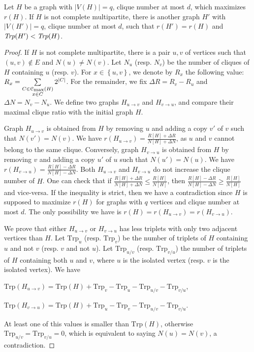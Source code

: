 \documentclass[a4paper,UKenglish,numberwithinsect,cleveref, autoref,anonymous]{lipics-v2021}
\newcommand{\set}[1]{\left\{ #1 \right\}}
\newcommand{\card}[1]{\left| #1 \right|}
\newcommand{\mcalcm}{\mathcal{C}_{\mbox{\scriptsize{max}}}}
\newcommand{\trp}{\mbox{Trp}}
\newcommand{\huv}{H_{u \rightarrow v}}
\newcommand{\hvu}{H_{v \rightarrow u}}
\begin{document}
\begin{theorem}
Let $H$ be a graph with $\card{V(H)} = q$, clique number at most $d$, which maximizes $r(H)$. If $H$ is not complete multipartite, there is another graph $H'$ with $\card{V(H')} = q$, clique number at most $d$, such that $r(H') = r(H)$ and $\emph{Trp}(H') < \emph{Trp}(H)$. 
\label{th:complete_multi}
\end{theorem}
\begin{proof}
If $H$ is not complete multipartite, there is a pair $u,v$ of vertices such that $(u,v) \notin E$ and $N(u) \neq N(v)$. Let $N_u$ (resp. $N_v$) be the number of cliques of $H$ containing $u$ (resp. $v$). For $x \in \set{u,v}$, we denote by $R_x$ the following value: $R_x = \sum\limits_{\substack{C \in \mcalcm(H) \\ x \in C}} 2^{\card{C}}$. For the remainder, we fix $\Delta R = R_v - R_u$ and $\Delta N = N_v - N_u$.
We define two graphs $\huv$ and $\hvu$, and compare their maximal clique ratio with the initial graph $H$.

Graph $\huv$ is obtained from $H$ by removing $u$ and adding a copy $v'$ of $v$ such that $N(v') = N(v)$. We have $r(\huv) = \frac{R\left[ H\right] + \Delta R}{N\left[ H\right] + \Delta N}$, as $u$ and $v$ cannot belong to the same clique. Conversely, graph $\hvu$ is obtained from $H$ by removing $v$ and adding a copy $u'$ of $u$ such that $N(u') = N(u)$. We have $r(\hvu) = \frac{R\left[ H\right] - \Delta R}{N\left[ H\right] - \Delta N}$. Both $\huv$ and $\hvu$ do not increase the clique number of $H$. One can check that if $\frac{R\left[ H\right] + \Delta R}{N\left[ H\right] + \Delta N} \le \frac{R\left[ H\right]}{N\left[ H\right]}$, then $\frac{R\left[ H\right] - \Delta R}{N\left[ H\right] - \Delta N} \ge \frac{R\left[ H\right]}{N\left[ H\right]}$ and vice-versa. If the inequality is strict, then we have a contradiction since $H$ is supposed to maximize $r(H)$ for graphs with $q$ vertices and clique number at most $d$. The only possibility we have is $r(H) = r(\huv) = r(\hvu)$.

We prove that either $\huv$ or $\hvu$ has less triplets with only two adjacent vertices than $H$. Let $\trp_u$ (resp. $\trp_v$) be the number of triplets of $H$ containing $u$ and not $v$ (resp. $v$ and not $u$). Let $\trp_{u/v}$ (resp. $\trp_{v/u}$) the number of triplets of $H$ containing both $u$ and $v$, where $u$ is the isolated vertex (resp. $v$ is the isolated vertex). We have
\begin{description}
    \item $\trp(\huv) = \trp(H) + \trp_v - \trp_u - \trp_{u/v} - \trp_{v/u}$,
    \item $\trp(\hvu) = \trp(H) + \trp_u - \trp_v - \trp_{u/v} - \trp_{v/u}$.
\end{description}
At least one of this values is smaller than $\trp(H)$, otherwise $\trp_{u/v} = \trp_{v/u} = 0$, which is equivalent to saying $N(u) = N(v)$, a contradiction.
\end{proof}
\end{document}

